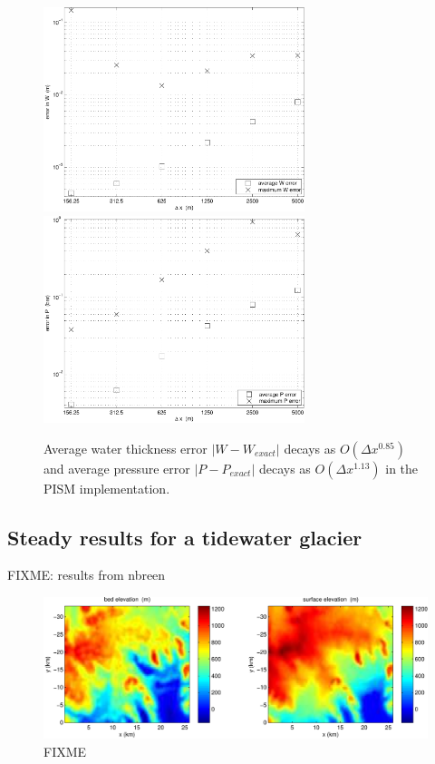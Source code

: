 \documentclass[11pt,final]{amsart}%
\begin{document}
\begin{figure}[ht]
\includegraphics[width=3.0in,keepaspectratio=true]{refineWpism} \quad \includegraphics[width=3.0in,keepaspectratio=true]{refinePpism}
\caption{Average water thickness error $|W-W_{exact}|$ decays as $O(\Delta x^{0.85})$ and average pressure error $|P-P_{exact}|$ decays as $O(\Delta x^{1.13})$ in the PISM implementation.}
\label{fig:refineWPpism}
\end{figure}


\subsection*{Steady results for a tidewater glacier}

FIXME: results from nbreen

\begin{figure}[ht]
\includegraphics[width=7.0in,keepaspectratio=true]{bed-surf-250m}
\caption{FIXME}
\end{figure}
\end{document}
